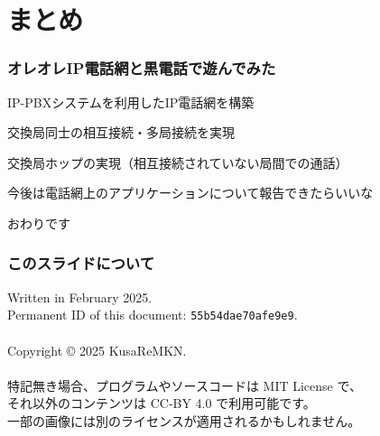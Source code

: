 \documentclass[
  lualatex,
  aspectratio=169,
  14pt
]{beamer}
\begin{document}
\section{まとめ}

\begin{frame}
  \frametitle{オレオレIP電話網と黒電話で遊んでみた}

  IP-PBXシステムを利用したIP電話網を構築

  交換局同士の相互接続・多局接続を実現

  交換局ホップの実現（相互接続されていない局間での通話）

  今後は電話網上のアプリケーションについて報告できたらいいな
\end{frame}

\begin{frame}[standout]
  おわりです
\end{frame}

\begin{frame}
  \frametitle{このスライドについて}

  Written in February 2025.\\
  \hspace{1.5\zw}Permanent ID of this document: \texttt{55b54dae70afe9e9}.
  \\~\\[-.5\baselineskip]

  Copyright © 2025 KusaReMKN.
  \\~\\[-.5\baselineskip]

  特記無き場合、プログラムやソースコードは MIT License で、\\
  \hspace{1.5\zw}それ以外のコンテンツは CC-BY 4.0 で利用可能です。\\
  \hspace{1.5\zw}一部の画像には別のライセンスが適用されるかもしれません。
\end{frame}
\end{document}
